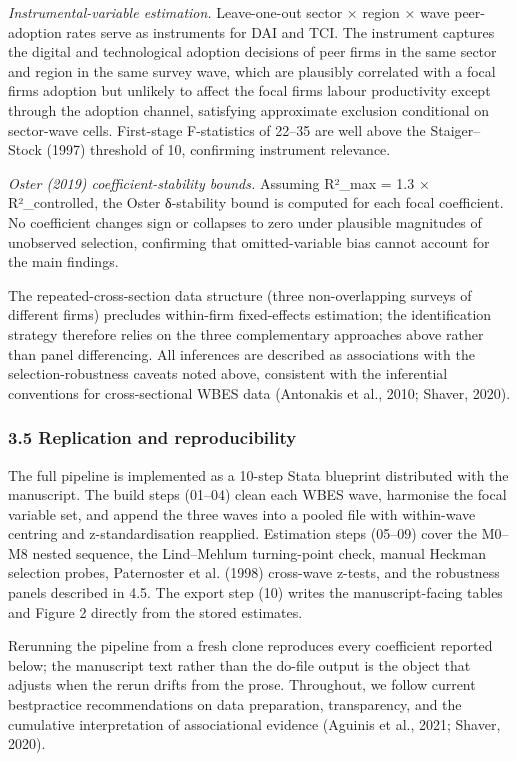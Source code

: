 \documentclass[12pt,a4paper]{article}
\begin{document}
\emph{Instrumental-variable estimation.} Leave-one-out sector × region ×
wave peer-adoption rates serve as instruments for DAI and TCI. The
instrument captures the digital and technological adoption decisions of
peer firms in the same sector and region in the same survey wave, which
are plausibly correlated with a focal firm\textquotesingle s adoption
but unlikely to affect the focal firm\textquotesingle s labour
productivity except through the adoption channel, satisfying approximate
exclusion conditional on sector-wave cells. First-stage F-statistics of
22--35 are well above the Staiger--Stock (1997) threshold of 10,
confirming instrument relevance.

\emph{Oster (2019) coefficient-stability bounds.} Assuming R²\_max = 1.3
× R²\_controlled, the Oster δ-stability bound is computed for each focal
coefficient. No coefficient changes sign or collapses to zero under
plausible magnitudes of unobserved selection, confirming that
omitted-variable bias cannot account for the main findings.

The repeated-cross-section data structure (three non-overlapping surveys
of different firms) precludes within-firm fixed-effects estimation; the
identification strategy therefore relies on the three complementary
approaches above rather than panel differencing. All inferences are
described as associations with the selection-robustness caveats noted
above, consistent with the inferential conventions for cross-sectional
WBES data (Antonakis et al., 2010; Shaver, 2020).

\hypertarget{35-replication-and-reproducibility}{%
\subsubsection{3.5 Replication and
reproducibility}\label{35-replication-and-reproducibility}}

The full pipeline is implemented as a 10-step Stata blueprint
distributed with the manuscript. The build steps (01--04) clean each
WBES wave, harmonise the focal variable set, and append the three waves
into a pooled file with within-wave centring and z-standardisation
reapplied. Estimation steps (05--09) cover the M0--M8 nested sequence,
the Lind--Mehlum turning-point check, manual Heckman selection probes,
Paternoster et al. (1998) cross-wave z-tests, and the robustness panels
described in 4.5. The export step (10) writes the manuscript-facing
tables and Figure 2 directly from the stored estimates.

Rerunning the pipeline from a fresh clone reproduces every coefficient
reported below; the manuscript text rather than the do-file output is
the object that adjusts when the rerun drifts from the prose.
Throughout, we follow current bestpractice recommendations on data
preparation, transparency, and the cumulative interpretation of
associational evidence (Aguinis et al., 2021; Shaver, 2020).
\end{document}
